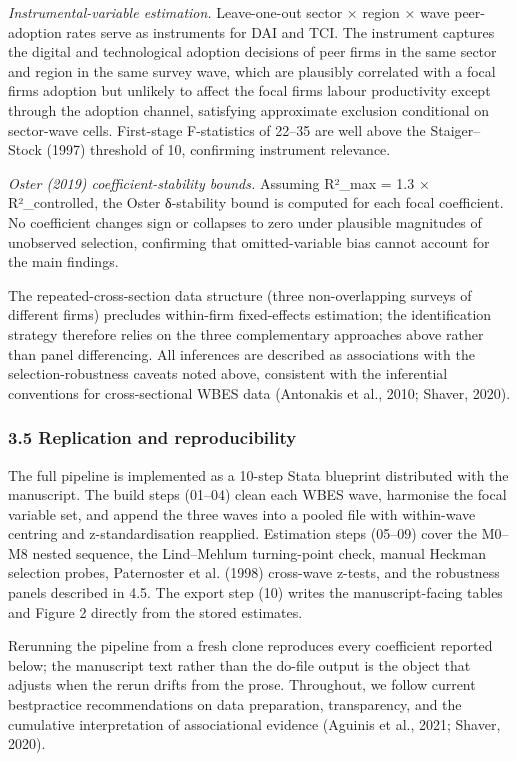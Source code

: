 \documentclass[12pt,a4paper]{article}
\begin{document}
\emph{Instrumental-variable estimation.} Leave-one-out sector × region ×
wave peer-adoption rates serve as instruments for DAI and TCI. The
instrument captures the digital and technological adoption decisions of
peer firms in the same sector and region in the same survey wave, which
are plausibly correlated with a focal firm\textquotesingle s adoption
but unlikely to affect the focal firm\textquotesingle s labour
productivity except through the adoption channel, satisfying approximate
exclusion conditional on sector-wave cells. First-stage F-statistics of
22--35 are well above the Staiger--Stock (1997) threshold of 10,
confirming instrument relevance.

\emph{Oster (2019) coefficient-stability bounds.} Assuming R²\_max = 1.3
× R²\_controlled, the Oster δ-stability bound is computed for each focal
coefficient. No coefficient changes sign or collapses to zero under
plausible magnitudes of unobserved selection, confirming that
omitted-variable bias cannot account for the main findings.

The repeated-cross-section data structure (three non-overlapping surveys
of different firms) precludes within-firm fixed-effects estimation; the
identification strategy therefore relies on the three complementary
approaches above rather than panel differencing. All inferences are
described as associations with the selection-robustness caveats noted
above, consistent with the inferential conventions for cross-sectional
WBES data (Antonakis et al., 2010; Shaver, 2020).

\hypertarget{35-replication-and-reproducibility}{%
\subsubsection{3.5 Replication and
reproducibility}\label{35-replication-and-reproducibility}}

The full pipeline is implemented as a 10-step Stata blueprint
distributed with the manuscript. The build steps (01--04) clean each
WBES wave, harmonise the focal variable set, and append the three waves
into a pooled file with within-wave centring and z-standardisation
reapplied. Estimation steps (05--09) cover the M0--M8 nested sequence,
the Lind--Mehlum turning-point check, manual Heckman selection probes,
Paternoster et al. (1998) cross-wave z-tests, and the robustness panels
described in 4.5. The export step (10) writes the manuscript-facing
tables and Figure 2 directly from the stored estimates.

Rerunning the pipeline from a fresh clone reproduces every coefficient
reported below; the manuscript text rather than the do-file output is
the object that adjusts when the rerun drifts from the prose.
Throughout, we follow current bestpractice recommendations on data
preparation, transparency, and the cumulative interpretation of
associational evidence (Aguinis et al., 2021; Shaver, 2020).
\end{document}
